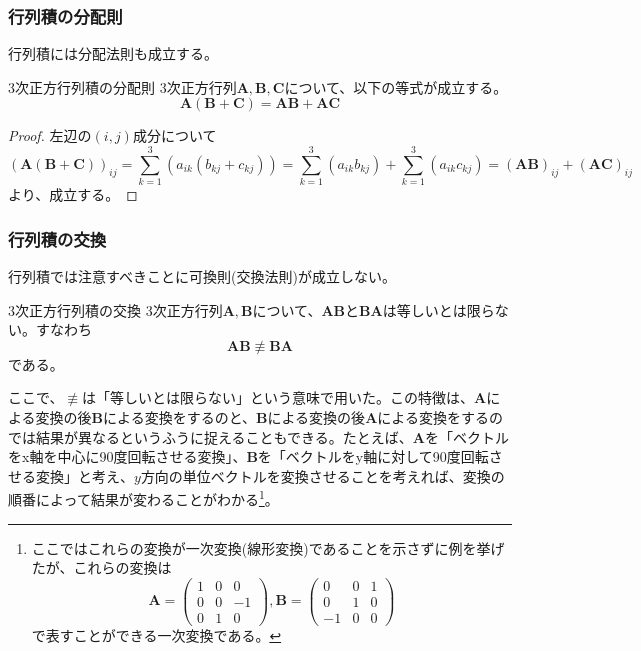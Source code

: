 \subsubsection{行列積の分配則}
行列積には分配法則も成立する。
\begin{theorem*}{3次正方行列積の分配則}
	3次正方行列\(\boldsymbol{A},\boldsymbol{B},\boldsymbol{C}\)について、以下の等式が成立する。
	\begin{equation}
		\boldsymbol{A}(\boldsymbol{B}+\boldsymbol{C})=\boldsymbol{A}\boldsymbol{B}+\boldsymbol{A}\boldsymbol{C}
	\end{equation}
\end{theorem*}
\begin{proof}
	左辺の\((i,j)\)成分について
	\begin{equation}
		(\boldsymbol{A}(\boldsymbol{B}+\boldsymbol{C}))_{ij}
		=\sum_{k=1}^{3}\left( a_{ik}(b_{kj}+c_{kj})\right)
		=\sum_{k=1}^{3}\left( a_{ik}b_{kj}\right)+\sum_{k=1}^{3}\left( a_{ik}c_{kj}\right)
		=(\boldsymbol{A}\boldsymbol{B})_{ij}+(\boldsymbol{A}\boldsymbol{C})_{ij}
	\end{equation}
	より、成立する。
\end{proof}
\subsubsection{行列積の交換}
行列積では注意すべきことに可換則(交換法則)が成立しない。
\begin{theorem*}{3次正方行列積の交換}
	3次正方行列\(\boldsymbol{A},\boldsymbol{B}\)について、\(\boldsymbol{A}\boldsymbol{B}\)と\(\boldsymbol{B}\boldsymbol{A}\)は等しいとは限らない。すなわち
	\begin{equation}
		\boldsymbol{A}\boldsymbol{B}\not\equiv\boldsymbol{B}\boldsymbol{A}
	\end{equation}
	である。
\end{theorem*}
ここで、\(\not \equiv\)は「等しいとは限らない」という意味で用いた。この特徴は、\(\boldsymbol{A}\)による変換の後\(\boldsymbol{B}\)による変換をするのと、\(\boldsymbol{B}\)による変換の後\(\boldsymbol{A}\)による変換をするのでは結果が異なるというふうに捉えることもできる。たとえば、\(\boldsymbol{A}\)を「ベクトルをx軸を中心に90度回転させる変換」、\(\boldsymbol{B}\)を「ベクトルをy軸に対して90度回転させる変換」と考え、\(y\)方向の単位ベクトルを変換させることを考えれば、変換の順番によって結果が変わることがわかる\footnote{ここではこれらの変換が一次変換(線形変換)であることを示さずに例を挙げたが、これらの変換は
	\begin{equation}
		\boldsymbol{A}=\begin{pmatrix}
			1 & 0 & 0  \\
			0 & 0 & -1 \\
			0 & 1 & 0
		\end{pmatrix},
		\boldsymbol{B}=\begin{pmatrix}
			0  & 0 & 1 \\
			0  & 1 & 0 \\
			-1 & 0 & 0
		\end{pmatrix}
	\end{equation}
	で表すことができる一次変換である。
}。

